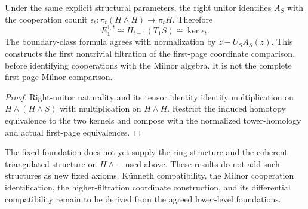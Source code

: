 \begin{proposition}
  \label{prop:h6-first-filtration-cooperations}
  \leanok
  Under the same explicit structural parameters, the right unitor
  identifies $A_S$ with the cooperation counit
  $\epsilon_t:\pi_t(H\wedge H)\to\pi_tH$. Therefore
  \[
    E_1^{1,t}\cong H_{t-1}(T_1S)\cong\ker\epsilon_t.
  \]
  The boundary-class formula agrees with normalization by $z-U_SA_S(z)$.
  This constructs the first nontrivial filtration of the first-page
  coordinate comparison, before identifying cooperations with the Milnor
  algebra. It is not the complete first-page Milnor comparison.
\end{proposition}
\begin{proof}
  Right-unitor naturality and its tensor identity identify multiplication on
  $H\wedge(H\wedge S)$ with multiplication on $H\wedge H$. Restrict the
  induced homotopy equivalence to the two kernels and compose with the
  normalized tower-homology and actual first-page equivalences.
  \leanok
\end{proof}

The fixed foundation does not yet supply the ring structure and the coherent
triangulated structure on $H\wedge-$ used above. These results do not add
such structures as new fixed axioms. K\"unneth compatibility, the Milnor
cooperation identification, the higher-filtration coordinate construction,
and its differential compatibility remain to be derived from the agreed
lower-level foundations.

